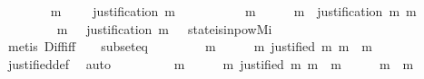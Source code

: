 \begin{isabellebody}
\ \ \ \ \isamarkupfalse%
\ {\isachardoublequoteopen}{\isasymnot}\ {\isacharparenleft}{\isasymexists}\ m\ {\isasymin}\ {\isasymsigma}\ {\isacharminus}\ {\isasymsigma}{\isacharprime}{\isachardot}\ justification\ m\ {\isasymsubseteq}\ {\isasymsigma}{\isacharprime}{\isacharparenright}{\isachardoublequoteclose}\isanewline
\ \ \ \ \isamarkupfalse%
\ \isamarkupfalse%
\ {\isachardoublequoteopen}{\isasymforall}\ m\ {\isasymin}\ {\isasymsigma}\ {\isacharminus}\ {\isasymsigma}{\isacharprime}{\isachardot}\ {\isasymexists}\ m{\isacharprime}\ {\isasymin}\ justification\ m{\isachardot}\ m{\isacharprime}\ {\isasymin}\ {\isasymsigma}\ {\isacharminus}\ {\isasymsigma}{\isacharprime}{\isachardoublequoteclose}\isanewline
\ \ \ \ \ \ \isamarkupfalse%
\ {\isacartoucheopen}{\isasymnot}\ {\isacharparenleft}{\isasymexists}m{\isasymin}{\isasymsigma}\ {\isacharminus}\ {\isasymsigma}{\isacharprime}{\isachardot}\ justification\ m\ {\isasymsubseteq}\ {\isasymsigma}{\isacharprime}{\isacharparenright}{\isacartoucheclose}\ state{\isacharunderscore}is{\isacharunderscore}in{\isacharunderscore}pow{\isacharunderscore}Mi\ {\isacartoucheopen}{\isasymsigma}{\isacharprime}\ {\isasymsubset}\ {\isasymsigma}{\isacartoucheclose}\isanewline
\ \ \ \ \ \ \isamarkupfalse%
\ {\isacharparenleft}metis\ Diff{\isacharunderscore}iff\ {\isacartoucheopen}{\isasymsigma}\ {\isasymin}\ {\isasymSigma}{\isacartoucheclose}\ subset{\isacharunderscore}eq{\isacharparenright}\isanewline
\ \ \ \ \isamarkupfalse%
\ \isamarkupfalse%
\ {\isachardoublequoteopen}{\isasymforall}\ m\ {\isasymin}\ {\isasymsigma}\ {\isacharminus}\ {\isasymsigma}{\isacharprime}{\isachardot}\ {\isasymexists}\ m{\isacharprime}{\isachardot}\ justified\ m{\isacharprime}\ m\ {\isasymand}\ m{\isacharprime}\ {\isasymin}\ {\isasymsigma}\ {\isacharminus}\ {\isasymsigma}{\isacharprime}{\isachardoublequoteclose}\isanewline
\ \ \ \ \ \ \isamarkupfalse%
\ justified{\isacharunderscore}def\ \isamarkupfalse%
\ auto\ \isanewline
\ \ \ \ \isamarkupfalse%
\ \isamarkupfalse%
\ {\isachardoublequoteopen}{\isasymforall}\ m\ {\isasymin}\ {\isasymsigma}\ {\isacharminus}\ {\isasymsigma}{\isacharprime}{\isachardot}\ {\isasymexists}\ m{\isacharprime}{\isachardot}\ justified\ m{\isacharprime}\ m\ {\isasymand}\ m{\isacharprime}\ {\isasymin}\ {\isasymsigma}\ {\isacharminus}\ {\isasymsigma}{\isacharprime}\ {\isasymand}\ m\ {\isasymnoteq}\ m{\isacharprime}{\isachardoublequoteclose}\ \isanewline
\ \ \ \ \ \ \isamarkupfalse%

\end{isabellebody}
